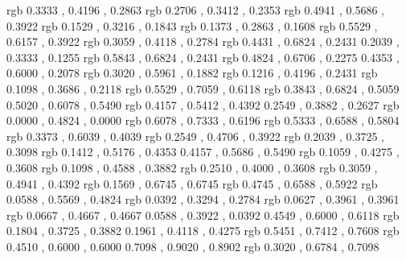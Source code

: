 \definecolor{rikancha}	{rgb}	{	0.3333	,	0.4196	,	0.2863	}
\definecolor{aikobicha}	{rgb}	{	0.2706	,	0.3412	,	0.2353	}
\definecolor{koke}	{rgb}	{	0.4941	,	0.5686	,	0.3922	}
\definecolor{miru}	{rgb}	{	0.1529	,	0.3216	,	0.1843	}
\definecolor{sensai}	{rgb}	{	0.1373	,	0.2863	,	0.1608	}
\definecolor{baiko}	{rgb}	{	0.5529	,	0.6157	,	0.3922	}
\definecolor{iwai}	{rgb}	{	0.3059	,	0.4118	,	0.2784	}
\definecolor{hiwamoegi}	{rgb}	{	0.4431	,	0.6824	,	0.2431	}
\definecolor{yanagisusutake}{rgb}	{	0.2039	,	0.3333	,	0.1255	}
\definecolor{urayanagi}	{rgb}	{	0.5843	,	0.6824	,	0.2431	}
\definecolor{usumoegi}	{rgb}	{	0.4824	,	0.6706	,	0.2275	}
\definecolor{yanagizome}{rgb}	{	0.4353	,	0.6000	,	0.2078	}
\definecolor{moegi}	{rgb}	{	0.3020	,	0.5961	,	0.1882	}
\definecolor{aoni}	{rgb}	{	0.1216	,	0.4196	,	0.2431	}
\definecolor{matsuba}	{rgb}	{	0.1098	,	0.3686	,	0.2118	}
\definecolor{usuao}	{rgb}	{	0.5529	,	0.7059	,	0.6118	}
\definecolor{wakatake}	{rgb}	{	0.3843	,	0.6824	,	0.5059	}
\definecolor{yanaginezumi}{rgb}	{	0.5020	,	0.6078	,	0.5490	}
\definecolor{oitake}	{rgb}	{	0.4157	,	0.5412	,	0.4392	}
\definecolor{sensaimidori}{rgb}	{	0.2549	,	0.3882	,	0.2627	}
\definecolor{midori}	{rgb}	{	0.0000	,	0.4824	,	0.0000	}
\definecolor{byakuroku}	{rgb}	{	0.6078	,	0.7333	,	0.6196	}
\definecolor{sabiseiji}	{rgb}	{	0.5333	,	0.6588	,	0.5804	}
\definecolor{rokusho}	{rgb}	{	0.3373	,	0.6039	,	0.4039	}
\definecolor{tokusa}	{rgb}	{	0.2549	,	0.4706	,	0.3922	}
\definecolor{onandocha}	{rgb}	{	0.2039	,	0.3725	,	0.3098	}
\definecolor{aotake}	{rgb}	{	0.1412	,	0.5176	,	0.4353	}
\definecolor{rikyunezumi}{rgb}	{	0.4157	,	0.5686	,	0.5490	}
\definecolor{birodo}	{rgb}	{	0.1059	,	0.4275	,	0.3608	}
\definecolor{mishiao}	{rgb}	{	0.1098	,	0.4588	,	0.3882	}
\definecolor{aimirucha}	{rgb}	{	0.2510	,	0.4000	,	0.3608	}
\definecolor{tonotya}	{rgb}	{	0.3059	,	0.4941	,	0.4392	}
\definecolor{mizuasagi}	{rgb}	{	0.1569	,	0.6745	,	0.6745	}
\definecolor{seji}	{rgb}	{	0.4745	,	0.6588	,	0.5922	}
\definecolor{seheki}	{rgb}	{	0.0588	,	0.5569	,	0.4824	}
\definecolor{sabitetsu}	{rgb}	{	0.0392	,	0.3294	,	0.2784	}
\definecolor{tetsu}	{rgb}	{	0.0627	,	0.3961	,	0.3961	}
\definecolor{omeshicha}	{rgb}	{	0.0667	,	0.4667	,	0.4667	}
\definecolor{korainando}{rgb}	{	0.0588	,	0.3922	,	0.0392	}
\definecolor{minatonezumi}{rgb}	{	0.4549	,	0.6000	,	0.6118	}
\definecolor{aonibi}	{rgb}	{	0.1804	,	0.3725	,	0.3882	}
\definecolor{tetsuonando}{rgb}	{	0.1961	,	0.4118	,	0.4275	}
\definecolor{mizu}	{rgb}	{	0.5451	,	0.7412	,	0.7608	}
\definecolor{sabiasagi}	{rgb}	{	0.4510	,	0.6000	,	0.6000	}
\definecolor{kamenozoki}{rgb}	{	0.7098	,	0.9020	,	0.8902	}
\definecolor{asagi}	{rgb}	{	0.3020	,	0.6784	,	0.7098	}
